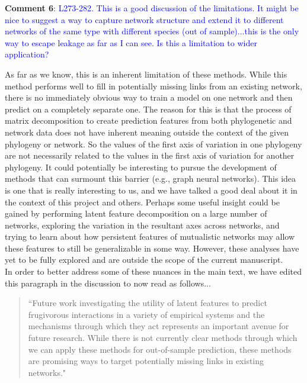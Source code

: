 \documentclass{article}
\begin{document}
\textbf{Comment 6}: \textcolor{blue}{L273-282. This is a good discussion of the limitations. It might be nice to suggest a way to capture network structure and extend it to different networks of the same type with different species (out of sample)...this is the only way to escape leakage as far as I can see. Is this a limitation to wider application?}


As far as we know, this is an inherent limitation of these methods. While this method performs well to fill in potentially missing links from an existing network, there is no immediately obvious way to train a model on one network and then predict on a completely separate one. The reason for this is that the process of matrix decomposition to create prediction features from both phylogenetic and network data does not have inherent meaning outside the context of the given phylogeny or network. So the values of the first axis of variation in one phylogeny are not necessarily related to the values in the first axis of variation for another phylogeny.  It could potentially be interesting to pursue the development of methods that can surmount this barrier (e.g., graph neural networks). This idea is one that is really interesting to us, and we have talked a good deal about it in the context of this project and others. Perhaps some useful insight could be gained by performing latent feature decomposition on a large number of networks, exploring the variation in the resultant axes across networks, and trying to learn about how persistent features of mutualistic networks may allow these features to still be generalizable in some way. However, these analyses have yet to be fully explored and are outside the scope of the current manuscript.\\

In order to better address some of these nuances in the main text, we have edited this paragraph in the discussion to now read as follows... 
\begin{quote}
    ``Future work investigating the utility of latent features to predict frugivorous interactions in a variety of empirical systems and the mechanisms through which they act represents an important avenue for future research. While there is not currently clear methods through which we can apply these methods for out-of-sample prediction, these methods are promising ways to target potentially missing links in existing networks."
\end{quote}
\end{document}
